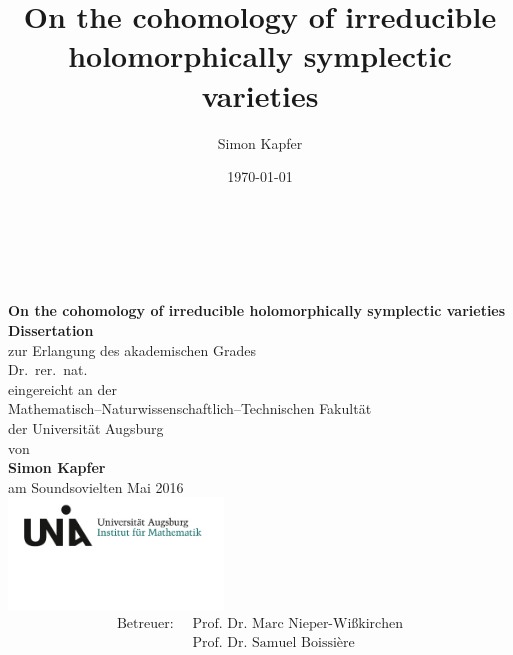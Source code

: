 \documentclass[letter]{article}
\begin{document}
\title{
\bf On the cohomology of irreducible holomorphically symplectic varieties
}


\author{Simon Kapfer}


\date{\today}
\thispagestyle{empty}
\begin{center}
\ \\
\ \\
\ \\
\textbf{ \LARGE On the cohomology of irreducible holomorphically symplectic varieties}
\\
\vspace{1cm}
\Large \textbf{Dissertation} \\
\Large 
\vspace{0.5cm}
\textnormal\large zur Erlangung des akademischen Grades \\
\vspace{5mm}
Dr.~rer.~nat. \\
\vspace{1cm}
eingereicht an der \\
Mathematisch--Naturwissenschaftlich--Technischen Fakult\"at\\
der Universit\"at Augsburg
\\ \vspace{1cm}
von \\
\textbf{Simon Kapfer}\\
\vspace{8mm}
am Soundsovielten Mai 2016 \\
\vspace{15mm}
\includegraphics[height=30mm]{LogoInstitut.png}
\vspace{-10mm}
\begin{align*}
\text{Betreuer: }\ 
& \text{Prof.~Dr.~Marc Nieper-Wi\ss kirchen}\\
& \text{Prof.~Dr.~Samuel Boissi\`ere}
\end{align*}
\end{center}
\pagebreak
\end{document}
